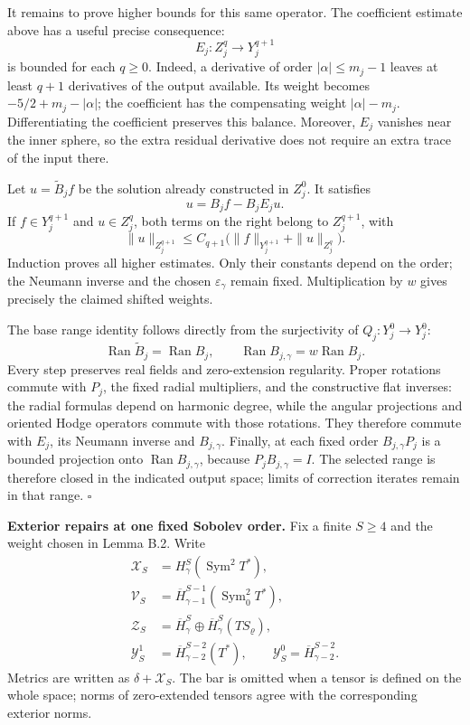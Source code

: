 \documentclass[
  english,
  11pt,
  reqno]{amsart}
\makeatletter
\newcommand{\paperleadspace}{%
  \par\if@nobreak\else
    \addpenalty{\@secpenalty}\addvspace{.5\baselineskip}%
  \fi}
\newcommand{\paperleadin}[1]{%
  \ifvmode\paperleadspace\fi
  \textbf{#1}}
\makeatother
\begin{document}
It remains to prove higher bounds for this same operator. The
coefficient estimate above has a useful precise consequence: \[
E_j:Z_j^q\longrightarrow Y_j^{q+1}
\] is bounded for each \(q\ge0\). Indeed, a derivative of order
\(|\alpha|\le m_j-1\) leaves at least \(q+1\) derivatives of the output
available. Its weight becomes \(-5/2+m_j-|\alpha|\); the coefficient has
the compensating weight \(|\alpha|-m_j\). Differentiating the
coefficient preserves this balance. Moreover, \(E_j\) vanishes near the
inner sphere, so the extra residual derivative does not require an extra
trace of the input there.

Let \(u=\widetilde B_j f\) be the solution already constructed in
\(Z_j^0\). It satisfies \[
u=B_jf-B_jE_ju.
\] If \(f\in Y_j^{q+1}\) and \(u\in Z_j^q\), both terms on the right
belong to \(Z_j^{q+1}\), with \[
\|u\|_{Z_j^{q+1}}
\le C_{q+1}\bigl(
\|f\|_{Y_j^{q+1}}+\|u\|_{Z_j^q}\bigr).
\] Induction proves all higher estimates. Only their constants depend on
the order; the Neumann inverse and the chosen \(\varepsilon_\gamma\)
remain fixed. Multiplication by \(w\) gives precisely the claimed
shifted weights.

The base range identity follows directly from the surjectivity of
\(Q_j:Y_j^0\to Y_j^0\): \[
\operatorname{Ran}\widetilde B_j=\operatorname{Ran}B_j,
\qquad
\operatorname{Ran}B_{j,\gamma}
=w\operatorname{Ran}B_j.
\] Every step preserves real fields and zero-extension regularity.
Proper rotations commute with \(P_j\), the fixed radial multipliers, and
the constructive flat inverses: the radial formulas depend on harmonic
degree, while the angular projections and oriented Hodge operators
commute with those rotations. They therefore commute with \(E_j\), its
Neumann inverse and \(B_{j,\gamma}\). Finally, at each fixed order
\(B_{j,\gamma}P_j\) is a bounded projection onto
\(\operatorname{Ran}B_{j,\gamma}\), because \(P_jB_{j,\gamma}=I\). The
selected range is therefore closed in the indicated output space; limits
of correction iterates remain in that range. \hfill\(\square\)

\paperleadin{Exterior repairs at one fixed Sobolev order.} Fix a finite \(S\ge4\) and the weight chosen in Lemma B.2. Write \[
\begin{aligned}
\mathcal X_S&=H^S_\gamma(\operatorname{Sym}^2T^*),\\
\mathcal V_S&=\overline H^{S-1}_{\gamma-1}
(\operatorname{Sym}^2_0T^*),\\
\mathcal Z_S&=\overline H^S_\gamma
\oplus\overline H^S_\gamma(TS_\varrho),\\
\mathcal Y_S^1&=\overline H^{S-2}_{\gamma-2}(T^*),\qquad
\mathcal Y_S^0=\overline H^{S-2}_{\gamma-2}.
\end{aligned}
\] Metrics are written as \(\delta+\mathcal X_S\). The bar is omitted
when a tensor is defined on the whole space; norms of zero-extended
tensors agree with the corresponding exterior norms.
\end{document}
